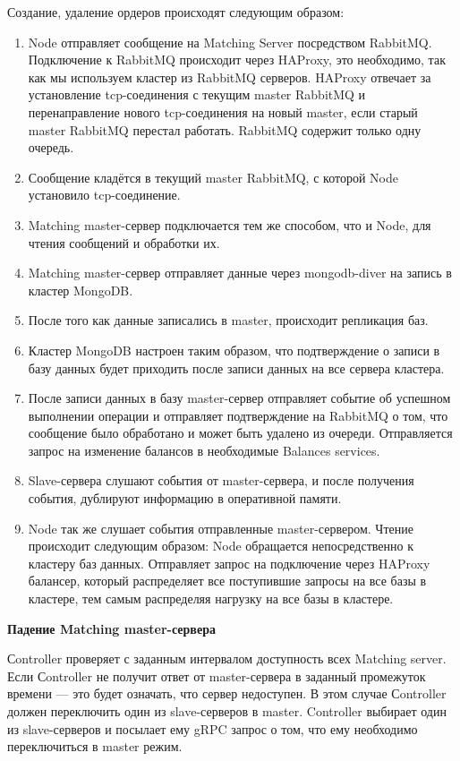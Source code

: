 Создание, удаление ордеров происходят следующим образом:
\begin{enumerate}
    \item Node отправляет сообщение на Matching Server посредством RabbitMQ. Подключение к RabbitMQ происходит через HAProxy, это необходимо, так как мы используем кластер из RabbitMQ серверов. HAProxy отвечает за установление tcp-соединения с текущим master RabbitMQ и перенаправление нового tcp-соединения на новый master, если старый master RabbitMQ перестал работать. RabbitMQ содержит только одну очередь.
    \item Сообщение кладётся в текущий master RabbitMQ, с которой Node установило tcp-соединение.
    \item Matching master-сервер подключается тем же способом, что и Node, для чтения сообщений и обработки их.
    \item Matching master-сервер отправляет данные через mongodb-diver на запись в кластер MongoDB.
    \item После того как данные записались в master, происходит репликация баз.
    \item Кластер MongoDB настроен таким образом, что подтверждение о записи в базу данных будет приходить после записи данных на все сервера кластера.
    \item После записи данных в базу master-сервер отправляет событие об успешном выполнении операции и отправляет подтверждение на RabbitMQ о том, что сообщение было обработано и может быть удалено из очереди. Отправляется запрос на изменение балансов в необходимые Balances services.
    \item Slave-сервера слушают события от master-сервера, и после получения события, дублируют информацию в оперативной памяти.
    \item Node так же слушает события отправленные master-сервером. Чтение происходит следующим образом: Node обращается непосредственно к кластеру баз данных. Отправляет запрос на подключение через HAProxy балансер, который распределяет все поступившие запросы на все базы в кластере, тем самым распределяя нагрузку на все базы в кластере.
\end{enumerate}

\textbf{Падение Matching master-сервера}

Сontroller проверяет с заданным интервалом доступность всех Matching server. Если Сontroller не получит ответ от master-сервера в заданный промежуток времени — это будет означать, что сервер недоступен. В этом случае Сontroller должен переключить один из slave-серверов в master. Controller выбирает один из slave-серверов и посылает ему gRPC запрос о том, что ему необходимо переключиться в master режим.

